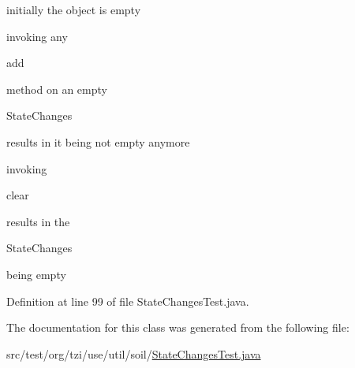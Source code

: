 \begin{DoxyItemize}
\item initially the object is empty\par

\item invoking any
\begin{DoxyCode}
add 
\end{DoxyCode}
 method on an empty
\begin{DoxyCode}
StateChanges 
\end{DoxyCode}
 results in it being not empty anymore\par

\item invoking
\begin{DoxyCode}
clear 
\end{DoxyCode}
 results in the
\begin{DoxyCode}
StateChanges 
\end{DoxyCode}
 being empty\par
 
\end{DoxyItemize}

Definition at line 99 of file State\-Changes\-Test.\-java.



The documentation for this class was generated from the following file\-:\begin{DoxyCompactItemize}
\item 
src/test/org/tzi/use/util/soil/\hyperlink{_state_changes_test_8java}{State\-Changes\-Test.\-java}\end{DoxyCompactItemize}
